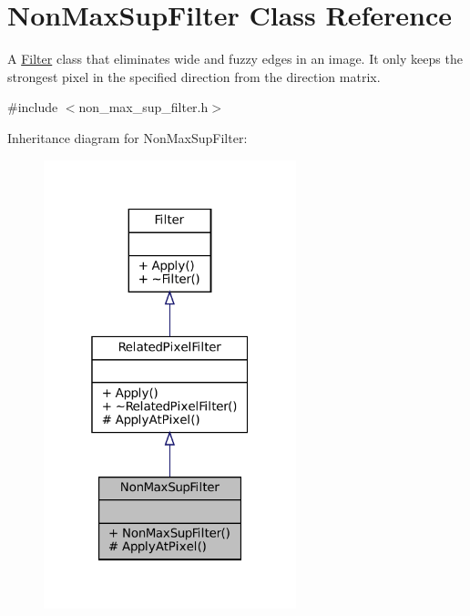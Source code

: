 \hypertarget{classNonMaxSupFilter}{}\section{Non\+Max\+Sup\+Filter Class Reference}
\label{classNonMaxSupFilter}


A \hyperlink{classFilter}{Filter} class that eliminates wide and fuzzy edges in an image. It only keeps the strongest pixel in the specified direction from the direction matrix.  




{\ttfamily \#include $<$non\+\_\+max\+\_\+sup\+\_\+filter.\+h$>$}



Inheritance diagram for Non\+Max\+Sup\+Filter\+:\nopagebreak
\begin{figure}[H]
\begin{center}
\leavevmode
\includegraphics[width=208pt]{classNonMaxSupFilter__inherit__graph}
\end{center}
\end{figure}


